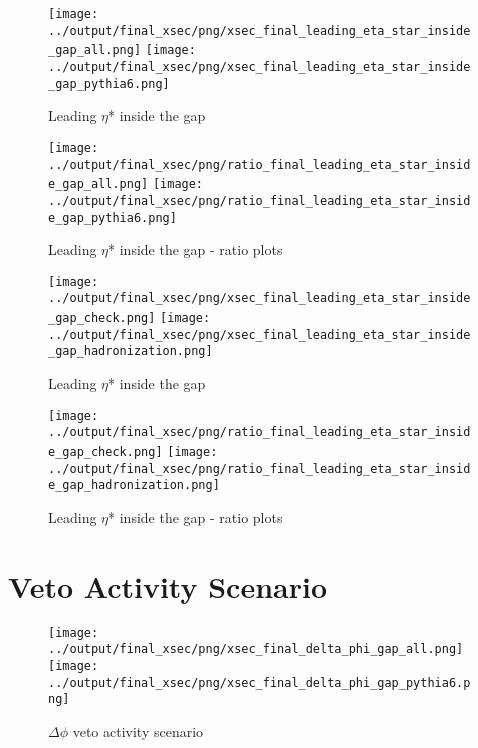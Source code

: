 \documentclass[11pt]{article}
\begin{document}
\begin{figure}[ht]
\centering
\texttt{[image: ../output/final\_xsec/png/xsec\_final\_leading\_eta\_star\_inside\_gap\_all.png]}
\texttt{[image: ../output/final\_xsec/png/xsec\_final\_leading\_eta\_star\_inside\_gap\_pythia6.png]}
\caption{Leading $\eta$* inside the gap}
\label{fig:leading_eta_star_inside_gap}
\end{figure}

\begin{figure}[ht]
\centering
\texttt{[image: ../output/final\_xsec/png/ratio\_final\_leading\_eta\_star\_inside\_gap\_all.png]}
\texttt{[image: ../output/final\_xsec/png/ratio\_final\_leading\_eta\_star\_inside\_gap\_pythia6.png]}
\caption{Leading $\eta$* inside the gap - ratio plots}
\label{fig:leading_eta_star_inside_gap_ratio}
\end{figure}

\begin{figure}[ht]
\centering
\texttt{[image: ../output/final\_xsec/png/xsec\_final\_leading\_eta\_star\_inside\_gap\_check.png]}
\texttt{[image: ../output/final\_xsec/png/xsec\_final\_leading\_eta\_star\_inside\_gap\_hadronization.png]}
\caption{Leading $\eta$* inside the gap}
\label{fig:leading_eta_star_inside_gapb}
\end{figure}

\begin{figure}[ht]
\centering
\texttt{[image: ../output/final\_xsec/png/ratio\_final\_leading\_eta\_star\_inside\_gap\_check.png]}
\texttt{[image: ../output/final\_xsec/png/ratio\_final\_leading\_eta\_star\_inside\_gap\_hadronization.png]}
\caption{Leading $\eta$* inside the gap - ratio plots}
\label{fig:leading_eta_star_inside_gapb_ratio}
\end{figure}

\clearpage
\section{Veto Activity Scenario}

\begin{figure}[ht]
\centering
\texttt{[image: ../output/final\_xsec/png/xsec\_final\_delta\_phi\_gap\_all.png]}
\texttt{[image: ../output/final\_xsec/png/xsec\_final\_delta\_phi\_gap\_pythia6.png]}
\caption{$\Delta\phi$ veto activity scenario}
\label{fig:delta_phi_gap}
\end{figure}
\end{document}
